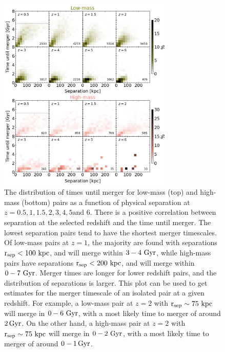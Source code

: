 \documentclass[twocolumn,linenumbers]{aastex631}
\begin{document}
\begin{figure}[htb]
    \begin{center}
    \includegraphics[width=0.75\textwidth]{plots/bet-on-it/8_2Dhist.png}
    \caption{The distribution of times until merger for low-mass (top) and high-mass (bottom) pairs as a function of physical separation at $z=0.5,1,1.5,2,3,4,5\mbox{and }6$. 
    There is a positive correlation between separation at the selected redshift and the time until merger. 
    The lowest separation pairs tend to have the shortest merger timescales.
    Of low-mass pairs at $z=1$, the majority are found with separations $\rm r_{sep}<100\,\mathrm{\,kpc}$, and will merge within $3-4\, \mathrm{\,Gyr}$, while high-mass pairs have separations $\rm r_{sep}<200\,\mathrm{\,kpc}$, and will merge within $0-7\, \mathrm{\,Gyr}$. 
    Merger times are longer for lower redshift pairs, and the distribution of separations is larger.
    This plot can be used to get estimates for the merger timescale of an isolated pair at a given redshift. 
    For example, a low-mass pair at $z=2$ with $\rm r_{sep}\sim 75\,\mathrm{\,kpc}$ will merge in $0-6\,\mathrm{\,Gyr}$, with a most likely time to merger of around $2\mathrm{\,Gyr}$.
    On the other hand, a high-mass pair at $z=2$ with $\rm r_{sep}\sim 75\,\mathrm{\,kpc}$ will merge in $0-2\,\mathrm{\,Gyr}$, with a most likely time to merger of around $0-1\mathrm{\,Gyr}$.
    }
    \label{fig:2dhist}
    \end{center}
\end{figure}
\end{document}
